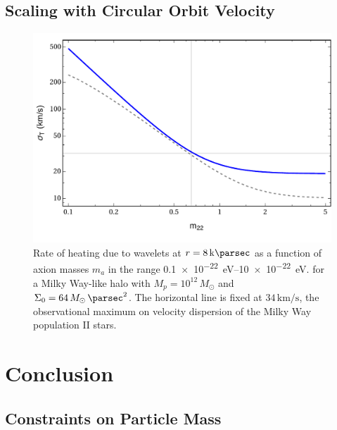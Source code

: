 \documentclass[usenatbib]{mnras}
\begin{document}
\subsection{Scaling with Circular Orbit Velocity}


\begin{figure}
\includegraphics[width=\columnwidth]{FDM_mass_dep}
\vspace*{-5mm}
\caption{Rate of heating due to wavelets at $r = 8\, \si{\kilo \parsec}$ as a function of axion masses $m_{a}$ in the range \SIrange{0.1 e-22}{ 10 e-22}{\electronvolt}. for a Milky Way-like halo with $M_p = 10^{12} \, M_\odot$ and $\Sigma_0 = 64 \, M_\odot \, \si{\per\parsec^2}$. The horizontal line is fixed at $34\, \si{\kilo\meter\per\second}$, the observational maximum on velocity dispersion of the Milky Way population II stars. }
\label{fig:radiusheating}
\end{figure}


\section{Conclusion}


\subsection{Constraints on Particle Mass}
\end{document}
